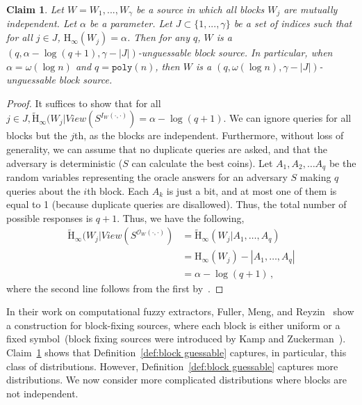 \documentclass[11pt]{article}
\newcommand{\defref}[1]{\mbox{Definition~\ref{#1}}}
\newcommand{\clref}[1]{\mbox{Claim~\ref{#1}}}
\newcommand{\poly}{\ensuremath{\mathtt{poly}}\xspace}
\newcommand{\Hoo}{\mathrm{H}_\infty}
\newcommand{\Hav}{\tilde{\mathrm{H}}_\infty}
\newtheorem{claim}[theorem]{Claim}
\begin{document}
\begin{claim}
\label{cl:independent high ent}
Let $W = W_1,  ... , W_\gamma$ be a source in which all blocks $W_j$  are mutually independent.  Let $\alpha$ be a parameter.  Let $J\subset \{1,..., \gamma\}$ be a set of indices such that for all $j\in J$, $\Hoo(W_j ) =\alpha $.  Then for any $q$, $W$ is a $(q, \alpha - \log (q+1), \gamma - |J|)$-unguessable block source.  In particular, when $\alpha = \omega(\log n)$ and $q = \poly(n)$, then $W$ is a $(q, \omega(\log n), \gamma - |J|)$-unguessable block source.
\end{claim}
\begin{proof}
It suffices to show that for all $j\in J, \Hav(W_j |View(S^{I_{W}(\cdot, \cdot)}) = \alpha -\log (q+1)$.
We can ignore queries for all blocks but the $j$th, as the blocks are independent. Furthermore, without loss of generality, we can assume that no duplicate queries are asked, and that the adversary is deterministic ($S$ can calculate the best coins). Let $A_1, A_2, \dots A_q$ be the random variables representing the oracle answers for an  adversary $S$ making $q$  queries about the $i$th block. Each $A_k$ is just a bit, and at most one of them  is equal to 1 (because duplicate queries are disallowed). Thus, the total number of possible responses is $q+1$. Thus, we have the following,
\begin{align*}
\Hav(W_j | View(S^{\mathcal{O}_{W}(\cdot, \cdot)}) &= \Hav(W_j| A_1, \dots, A_q)\\
&=\Hoo(W_j) - |A_1, \dots, A_q|\\
&=\alpha - \log (q+1)\,,
\end{align*}
where the second line follows from the first by~\cite[Lemma 2.2]{DBLP:journals/siamcomp/DodisORS08}.
\end{proof}
\noindent In their work on computational fuzzy extractors, Fuller, Meng, and Reyzin~\cite{fuller2013computational} show a construction for block-fixing sources, where each block is either uniform or a fixed symbol~(block fixing sources were introduced by Kamp and Zuckerman~\cite{KZ07}).  \clref{cl:independent high ent} shows that \defref{def:block guessable} captures, in particular, this class of distributions.
However, \defref{def:block guessable} captures more distributions.  We now consider more complicated distributions where blocks are not independent.
\end{document}
